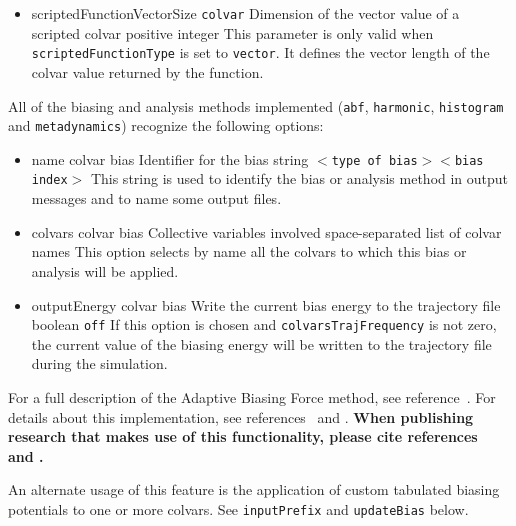 {\begin{itemize}
 \item %
  \key
    {scriptedFunctionVectorSize}{%
    \texttt{colvar}}{%
    Dimension of the vector value of a scripted colvar}{%
    positive integer}{%
    This parameter is only valid when \texttt{scriptedFunctionType} is
    set to \texttt{vector}. It defines the vector length of the colvar value
    returned by the function.}
\end{itemize}
} %


\label{sec:colvarbias}

All of the biasing and analysis methods implemented (\texttt{abf},
\texttt{harmonic}, \texttt{histogram} and \texttt{metadynamics})
recognize the following options:
\begin{itemize}

\item %
  \keydef
    {name}{%
    colvar bias}{%
    Identifier for the bias}{%
    string}{%
    \texttt{$<$type of bias$><$bias index$>$}}{%
    This string is used to identify the bias or analysis method in
    output messages and to name some output files.}

\item %
  \key
    {colvars}{%
    colvar bias}{%
    Collective variables involved}{%
    space-separated list of colvar names}{%
    This option selects by name all the colvars to which this bias or
    analysis will be applied.}

\item %
  \keydef
    {outputEnergy}{%
    colvar bias}{%
    Write the current bias energy to the trajectory file}{%
    boolean}{%
    \texttt{off}}{%
    If this option is chosen and  \texttt{colvarsTrajFrequency} is not zero, the current value of the biasing energy will be written to the trajectory file during the simulation.
}


\end{itemize}



\label{sec:colvarbias_abf}

For a full description of the Adaptive Biasing Force method, see
reference~\cite{Darve2008}. For details about this implementation,
see references~\cite{Henin2004} and \cite{Henin2010}. \textbf{When
publishing research that makes use of this functionality, please cite
references~\cite{Darve2008} and \cite{Henin2010}.}

An alternate usage of this feature is the application of custom
tabulated biasing potentials to one or more colvars. See
\texttt{inputPrefix} and \texttt{updateBias} below.


